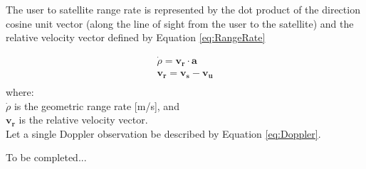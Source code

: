 \documentclass[11pt,letterpaper]{article}
\begin{document}
The user to satellite range rate is represented by the dot product of the direction cosine unit vector (along the line of sight from the user to the satellite) and the relative
velocity vector defined by Equation \ref{eq:RangeRate}

\begin{equation} \label{eq:RangeRate}
\begin{array}{l}
\dot{\rho} = \mathbf{v_r} \cdot \mathbf{a} \\
\mathbf{v_r} = \mathbf{v_s} - \mathbf{v_u} \\
\end{array}
\end{equation}
where: \\
$\dot{\rho}$ is the geometric range rate [m/s], and \\
$\mathbf{v_r}$ is the relative velocity vector. \\


Let a single Doppler observation be described by Equation \ref{eq:Doppler}.

To be completed...
\end{document}
